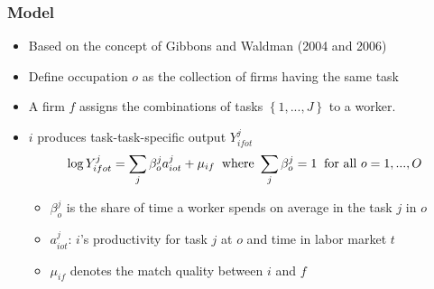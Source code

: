 \documentclass[11pt]{beamer}
\begin{document}
\begin{frame}
	\frametitle{Model}
	\begin{itemize}
		\item Based on the concept of Gibbons and Waldman (2004 and 2006)
		\item Define occupation $o$ as the collection of firms having the same task
		\item A firm $f$ assigns the combinations of tasks $\left\lbrace 1,...,J\right\rbrace $ to a worker.
		
%		
		\item $i$ produces task-task-specific output $Y_{ifot}^j$
		\begin{equation}
			\log{Y_{ifot}^j} = \sum_{j} \beta_{o}^{j} a_{iot}^j + \mu_{if} \;\;\text{where } \sum_{j} \beta_{o}^j = 1 \;\;\text{for all }o=1,...,O\notag
		\end{equation}
		\begin{itemize}
			\item $\beta_{o}^{j} $ is the share of time a worker spends on average in the task $j$ in  $o$
			\item $a_{iot}^j$:  $i$'s productivity for task $j$ at  $o$ and time in labor market $t$
			\item $\mu_{if}$ denotes the match quality between $i$ and $f$ 
		\end{itemize}
	\end{itemize}
\end{frame}
\end{document}
